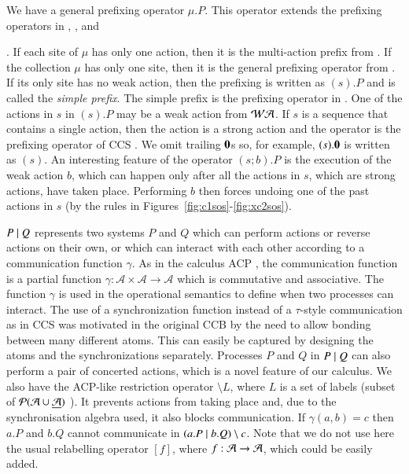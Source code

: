 We have a general prefixing operator $\mu.P$. This operator
extends the prefixing operators in \cite{DK2007}, \cite{Irek2012}, and {\cite{KU16,KU2017}. 
If each site of $\mu$ has only one action, then it is the multi-action prefix from \cite{DK2007}.
If the collection $\mu$ has only one site, then it is the general prefixing operator from \cite{KU16,KU2017}. 
If its only site has no weak action, then the prefixing is written as $(s).P$ and is called the
\emph{simple prefix}. 
The simple prefix is the prefixing operator in \cite{Irek2012}. 
One of the actions in $s$ in $(s).P$ may be a weak action from $\mathcal{WA}$. If $s$ is a sequence that contains   
a single action, then the action is a strong action and the operator 
is the prefixing operator of CCS \cite{Milner1980}.
We omit trailing $\mathbf{0}$s so, for example, $(s).\mathbf{0}$ is written as $(s)$.
%
%
%
%
An interesting feature of the operator $(s;b).P$ is the execution of the weak action $b$, which
can happen only after all the actions in $s$, which are strong actions, have taken place. Performing $b$ then forces
undoing one of the past actions in $s$ (by the  rules in Figures~\ref{fig:c1sos}-\ref{fig:xc2sos}).

$P\; \vert \; Q$ represents two systems $P$ and $Q$ which can perform actions or reverse actions on
their own, or which can interact with each other according to a communication function
$\gamma$. As in the calculus ACP \cite{ACPBook}, the communication function is a partial function 
$\gamma: \mathcal A \times \mathcal A \rightarrow \mathcal A$ which is commutative and associative. The function
$\gamma$ is used in the operational semantics to define when two processes can interact. The use of a synchronization function instead of a $\tau$-style communication as in CCS was motivated in the original CCB by the need to allow bonding between many different atoms. This can easily be captured by designing the atoms and the synchronizations separately.  Processes 
$P$ and $Q$ in $P\; \vert \; Q$ can also perform a pair of concerted actions,
which is a novel feature of our calculus.  We also have the ACP-like restriction operator 
$\setminus L$, where $L$ is a set of labels (subset of $\mathcal{P}(\mathcal{A} \cup \underline{\mathcal{A}})$ ). 
%
It prevents actions from taking place and, due to 
the synchronisation algebra used, it also blocks communication. If $\gamma(a,b)=c$ then $a.P$ and $b.Q$
cannot communicate in $(a.P\; \vert \; b.Q)\setminus c$.
Note that we do not use here the usual relabelling 
operator $[f]$, where $f: \mathcal{A} \rightarrow \mathcal{A}$, which could be easily added.

}
